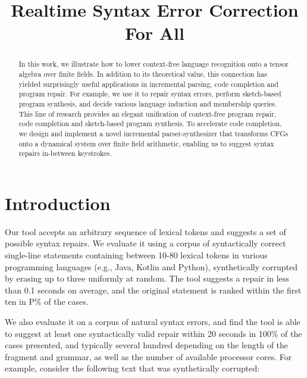\documentclass[sigplan,review,anonymous,acmsmall]{acmart}\settopmatter{printfolios=false,printccs=false,printacmref=false}
\begin{document}
\title{Realtime Syntax Error Correction For All}
\begin{abstract}
In this work, we illustrate how to lower context-free language recognition onto a tensor algebra over finite fields. In addition to its theoretical value, this connection has yielded surprisingly useful applications in incremental parsing, code completion and program repair. For example, we use it to repair syntax errors, perform sketch-based program synthesis, and decide various language induction and membership queries. This line of research provides an elegant unification of context-free program repair, code completion and sketch-based program synthesis. To accelerate code completion, we design and implement a novel incremental parser-synthesizer that transforms CFGs onto a dynamical system over finite field arithmetic, enabling us to suggest syntax repairs in-between keystrokes.
\end{abstract}

\maketitle

\section{Introduction}

  Our tool accepts an arbitrary sequence of lexical tokens and suggests a set of possible syntax repairs. We evaluate it using a corpus of syntactically correct single-line statements containing between 10-80 lexical tokens in various programming languages (e.g., Java, Kotlin and Python), synthetically corrupted by erasing up to three uniformly at random. The tool suggests a repair in less than 0.1 seconds on average, and the original statement is ranked within the first ten in P\% of the cases.

  We also evaluate it on a corpus of natural syntax errors, and find the tool is able to suggest at least one syntactically valid repair within 20 seconds in 100\% of the cases presented, and typically several hundred depending on the length of the fragment and grammar, as well as the number of available processor cores. For example, consider the following text that was synthetically corrupted:
\end{document}
